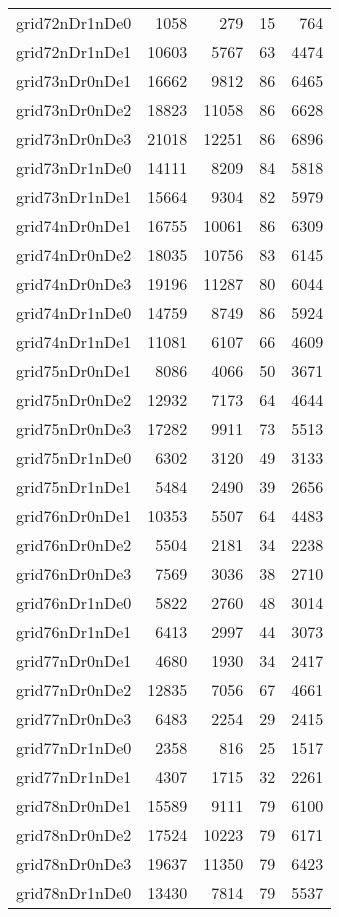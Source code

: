 \documentclass[../../../thesis.tex]{subfiles}
\begin{document}
\begin{longtable}{lrrrr}
grid72nDr1nDe0 & 1058 & 279 & 15 & 764 \\
grid72nDr1nDe1 & 10603 & 5767 & 63 & 4474 \\
grid73nDr0nDe1 & 16662 & 9812 & 86 & 6465 \\
grid73nDr0nDe2 & 18823 & 11058 & 86 & 6628 \\
grid73nDr0nDe3 & 21018 & 12251 & 86 & 6896 \\
grid73nDr1nDe0 & 14111 & 8209 & 84 & 5818 \\
grid73nDr1nDe1 & 15664 & 9304 & 82 & 5979 \\
grid74nDr0nDe1 & 16755 & 10061 & 86 & 6309 \\
grid74nDr0nDe2 & 18035 & 10756 & 83 & 6145 \\
grid74nDr0nDe3 & 19196 & 11287 & 80 & 6044 \\
grid74nDr1nDe0 & 14759 & 8749 & 86 & 5924 \\
grid74nDr1nDe1 & 11081 & 6107 & 66 & 4609 \\
grid75nDr0nDe1 & 8086 & 4066 & 50 & 3671 \\
grid75nDr0nDe2 & 12932 & 7173 & 64 & 4644 \\
grid75nDr0nDe3 & 17282 & 9911 & 73 & 5513 \\
grid75nDr1nDe0 & 6302 & 3120 & 49 & 3133 \\
grid75nDr1nDe1 & 5484 & 2490 & 39 & 2656 \\
grid76nDr0nDe1 & 10353 & 5507 & 64 & 4483 \\
grid76nDr0nDe2 & 5504 & 2181 & 34 & 2238 \\
grid76nDr0nDe3 & 7569 & 3036 & 38 & 2710 \\
grid76nDr1nDe0 & 5822 & 2760 & 48 & 3014 \\
grid76nDr1nDe1 & 6413 & 2997 & 44 & 3073 \\
grid77nDr0nDe1 & 4680 & 1930 & 34 & 2417 \\
grid77nDr0nDe2 & 12835 & 7056 & 67 & 4661 \\
grid77nDr0nDe3 & 6483 & 2254 & 29 & 2415 \\
grid77nDr1nDe0 & 2358 & 816 & 25 & 1517 \\
grid77nDr1nDe1 & 4307 & 1715 & 32 & 2261 \\
grid78nDr0nDe1 & 15589 & 9111 & 79 & 6100 \\
grid78nDr0nDe2 & 17524 & 10223 & 79 & 6171 \\
grid78nDr0nDe3 & 19637 & 11350 & 79 & 6423 \\
grid78nDr1nDe0 & 13430 & 7814 & 79 & 5537 \\

\end{longtable}
\end{document}
